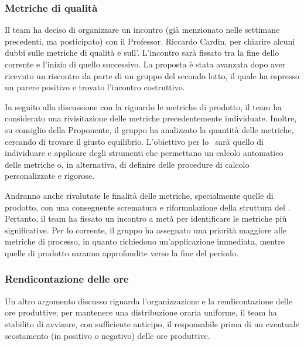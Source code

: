 \subsubsection{Metriche di qualità}
\par Il team ha deciso di organizzare un incontro (già menzionato nelle settimane precedenti, ma posticipato) con il Professor. Riccardo Cardin, per chiarire alcuni dubbi sulle metriche di qualità e sull'\AdR. L'incontro sarà fissato tra la fine dello  corrente e l'inizio di quello successivo.
La proposta è stata avanzata dopo aver ricevuto un riscontro da parte di un gruppo del secondo lotto, il quale ha espresso un parere positivo e trovato l'incontro costruttivo.
\par In seguito alla discussione con la  riguardo le metriche di prodotto, il team ha considerato una rivisitazione delle metriche precedentemente individuate. Inoltre, su consiglio della Proponente, il gruppo ha analizzato la quantità delle metriche, cercando di trovare il giusto equilibrio.
L'obiettivo per lo \ sarà quello di individuare e applicare degli strumenti che permettano un calcolo automatico delle metriche o, in alternativa, di definire delle procedure di calcolo personalizzate e rigorose. 

\par Andranno anche rivalutate le finalità delle metriche, specialmente quelle di prodotto, con una conseguente scrematura e riformulazione della struttura del \PdQ.
Pertanto, il team ha fissato un incontro a metà  per identificare le metriche più significative.
Per lo  corrente, il gruppo ha assegnato una priorità maggiore alle metriche di processo, in quanto richiedono un'applicazione immediata, mentre quelle di prodotto saranno approfondite verso la fine del periodo.
\subsubsection{Rendicontazione delle ore}
\par Un altro argomento discusso riguarda l'organizzazione e la rendicontazione delle ore produttive; per mantenere una distribuzione oraria uniforme, il team ha stabilito di avvisare, con sufficiente anticipo, il responsabile prima di un eventuale scostamento (in positivo o negativo) delle ore produttive.
